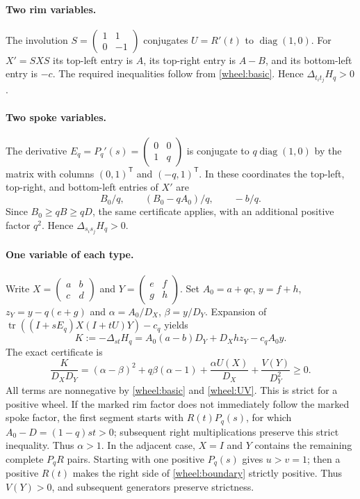 \documentclass[11pt,a4paper]{article}
\theoremstyle{definition}
\theoremstyle{remark}\newtheorem{remark}[theorem]{Remark}
\begin{document}
\paragraph{Two rim variables.}
The involution $S=\left(\begin{smallmatrix}1&1\\0&-1\end{smallmatrix}\right)$ conjugates $U=R'(t)$ to $\operatorname{diag}(1,0)$. For $X'=SXS$ its top-left entry is $A$, its top-right entry is $A-B$, and its bottom-left entry is $-c$. The required inequalities follow from \eqref{wheel:basic}. Hence $\Delta_{t_i t_j}H_q>0$.

\paragraph{Two spoke variables.}
The derivative $E_q=P_q'(s)=\left(\begin{smallmatrix}0&0\\1&q\end{smallmatrix}\right)$ is conjugate to $q\operatorname{diag}(1,0)$ by the matrix with columns $(0,1)^{\mathsf T}$ and $(-q,1)^{\mathsf T}$. In these coordinates the top-left, top-right, and bottom-left entries of $X'$ are
\[
 B_0/q,\qquad (B_0-qA_0)/q,\qquad -b/q.
\]
Since $B_0\ge qB\ge qD$, the same certificate applies, with an additional positive factor $q^2$. Hence $\Delta_{s_i s_j}H_q>0$.

\paragraph{One variable of each type.}
Write
$X=\left(\begin{smallmatrix}a&b\\c&d\end{smallmatrix}\right)$ and
$Y=\left(\begin{smallmatrix}e&f\\g&h\end{smallmatrix}\right)$.
Set $A_0=a+qc$, $y=f+h$, $z_Y=y-q(e+g)$ and
$\alpha=A_0/D_X$, $\beta=y/D_Y$. Expansion of
$\operatorname{tr}((I+sE_q)X(I+tU)Y)-c_q$ yields
\[
 K:=-\Delta_{st}H_q
 =A_0(a-b)D_Y+D_Xh z_Y-c_q A_0y.
\]
The exact certificate is
\begin{equation}\label{wheel:mixed}
 \boxed{\frac{K}{D_XD_Y}
 = (\alpha-\beta)^2+q\beta(\alpha-1)
   +\frac{\alpha U(X)}{D_X}+\frac{V(Y)}{D_Y^2}\ge0.}
\end{equation}
All terms are nonnegative by \eqref{wheel:basic} and \eqref{wheel:UV}.
This is strict for a positive wheel. If the marked rim factor does not immediately follow the marked spoke factor, the first segment starts with $R(t)P_q(s)$, for which
$A_0-D=(1-q)st>0$; subsequent right multiplications preserve this strict inequality. Thus $\alpha>1$. In the adjacent case, $X=I$ and $Y$ contains the remaining complete $P_qR$ pairs. Starting with one positive $P_q(s)$ gives $u>v=1$; then a positive $R(t)$ makes the right side of \eqref{wheel:boundary} strictly positive. Thus $V(Y)>0$, and subsequent generators preserve strictness.
\end{document}
